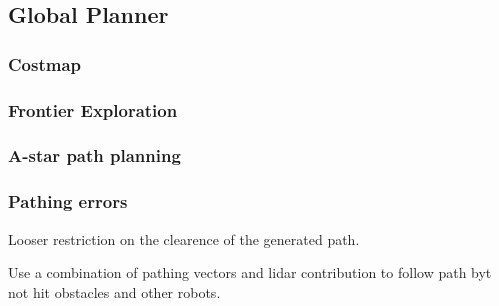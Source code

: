 
\subsection{Global Planner}
\subsubsection{Costmap}\label{sec:costmap}
\subsubsection{Frontier Exploration}\label{sec:frontier_exploration}
\subsubsection{A-star path planning}\label{sec:a_star}
\subsubsection{Pathing errors}\label{sec:pathing_errors}
Looser restriction on the clearence of the generated path.

Use a combination of pathing vectors and lidar contribution to follow path byt not hit obstacles and other robots.

